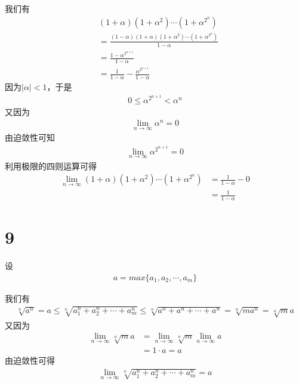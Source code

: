 \documentclass{article}
\begin{document}
\begin{itemize}
        我们有
        \begin{align*}
           & (1+\alpha)(1+\alpha^2)\cdots(1+\alpha^{2^n})                              \\
           & = \frac{(1-\alpha)(1+\alpha)(1+\alpha^2)\cdots(1+\alpha^{2^n})}{1-\alpha} \\
           & = \frac{1 - \alpha^{2^{n+1}}}{1 - \alpha}                                 \\
           & = \frac{1}{1 - \alpha} - \frac{\alpha^{2^{n+1}}}{1 - \alpha}
        \end{align*}
        因为$|\alpha| < 1$，于是
        \begin{align*}
          0 \leq \alpha^{2^{n + 1}} < \alpha^n
        \end{align*}
        又因为
        \begin{align*}
          \lim\limits_{n \to \infty} \alpha^n = 0
        \end{align*}
        由迫敛性可知
        \begin{align*}
          \lim\limits_{n \to \infty} \alpha^{2^{n + 1}} = 0
        \end{align*}
        利用极限的四则运算可得
        \begin{align*}
          \lim\limits_{n \to \infty} (1+\alpha)(1+\alpha^2)\cdots(1+\alpha^{2^n})
           & = \frac{1}{1 - \alpha} - 0 \\
           & = \frac{1}{1 - \alpha}
        \end{align*}
\end{itemize}

\section*{9}

设
\begin{align*}
  a = max\{a_1, a_2, \cdots, a_m\}
\end{align*}

我们有
\begin{align*}
  \sqrt[n]{a^n} = a
  \leq
  \sqrt[n]{a_1^n + a_2^n + \cdots + a_m^n}
  \leq
  \sqrt[n]{a^n + a^n + \cdots + a^n}
  = \sqrt[n]{m a^n} = \sqrt[n]{m}a
\end{align*}
又因为
\begin{align*}
  \lim\limits_{n \to \infty} \sqrt[n]{m}a
   & = \lim\limits_{n \to \infty} \sqrt[n]{m} \lim\limits_{n \to \infty} a \\
   & = 1 \cdot a = a
\end{align*}
由迫敛性可得
\begin{align*}
  \lim\limits_{n \to \infty} \sqrt[n]{a_1^n + a_2^n + \cdots + a_m^n} = a
\end{align*}
\end{document}
